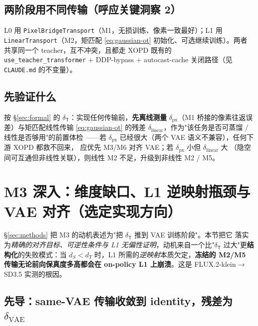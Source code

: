 \documentclass[11pt,a4paper]{article}
\newcommand{\Tmap}{\mathsf{T}}
\theoremstyle{definition}
\begin{document}
\subsection{两阶段用不同传输（呼应关键洞察 2）}
L0 用 \texttt{PixelBridgeTransport}（M1，无损训练、像素一致最好）；L1 用
\texttt{LinearTransport}（M2，矩匹配 \eqref{eq:gaussian-ot} 初始化、可选继续训练）。两者
共享同一个 teacher，互不冲突，且都走 XOPD 既有的 \texttt{use\_teacher\_transformer} +
DDP-bypass + autocast-cache 关闭路径（见 \texttt{CLAUDE.md} 的不变量）。

\subsection{先验证什么}
按 \S\ref{sec:formal} 的 $\delta_{\Tmap}$：实现任何传输前，\textbf{先离线测量}
$\delta_{\mathrm{px}}$（M1 桥接的像素往返误差）与矩匹配线性传输 \eqref{eq:gaussian-ot}
的残差 $\delta_{\mathrm{linear}}$，作为"该任务是否可蒸馏 / 线性是否够用"的前置体检
——若 $\delta_{\mathrm{px}}$ 已经很大（两个 VAE 语义不兼容），任何下游 XOPD 都救不回来，
应优先 M3/M6 对齐 VAE；若 $\delta_{\mathrm{px}}$ 小但 $\delta_{\mathrm{linear}}$ 大
（隐空间可互通但非线性关联），则线性 M2 不足，升级到非线性 M2 / M5。

\section{M3 深入：维度缺口、L1 逆映射瓶颈与 VAE 对齐（选定实现方向）}
\label{sec:m3-deep}

§\ref{sec:methods} 把 M3 的动机表述为"把 $\delta_{\Tmap}$ 推到 VAE 训练阶段"。本节把它
落实为\emph{精确的对齐目标、可逆性条件与 L1 无偏性证明}，动机来自一个比"$\delta_{\Tmap}$
过大"更\textbf{结构化}的失败模式：当 $d_S<d_T$ 时，L1 所需的\emph{逆映射}本质欠定，\textbf{冻结的
M2/M5 传输无论前向保真度多高都会在 on-policy L1 上崩溃}。这是 FLUX.2-klein$\to$SD3.5 实测的根因。

\subsection{先导：same-VAE 传输收敛到 identity，残差为 $\delta_{\mathrm{VAE}}$}
\end{document}
